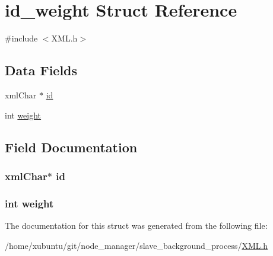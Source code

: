 \hypertarget{structid__weight}{}\section{id\+\_\+weight Struct Reference}
\label{structid__weight}


{\ttfamily \#include $<$X\+M\+L.\+h$>$}

\subsection*{Data Fields}
\begin{DoxyCompactItemize}
\item 
xml\+Char $\ast$ \hyperlink{structid__weight_a7350eff9ea77515688fd32b15775583c}{id}
\item 
int \hyperlink{structid__weight_aa01147b1f07072d246c76dc85d69df7c}{weight}
\end{DoxyCompactItemize}


\subsection{Field Documentation}
\hypertarget{structid__weight_a7350eff9ea77515688fd32b15775583c}{}
\subsubsection[{id}]{\setlength{\rightskip}{0pt plus 5cm}xml\+Char$\ast$ id}\label{structid__weight_a7350eff9ea77515688fd32b15775583c}
\hypertarget{structid__weight_aa01147b1f07072d246c76dc85d69df7c}{}
\subsubsection[{weight}]{\setlength{\rightskip}{0pt plus 5cm}int weight}\label{structid__weight_aa01147b1f07072d246c76dc85d69df7c}


The documentation for this struct was generated from the following file\+:\begin{DoxyCompactItemize}
\item 
/home/xubuntu/git/node\+\_\+manager/slave\+\_\+background\+\_\+process/\hyperlink{_x_m_l_8h}{X\+M\+L.\+h}\end{DoxyCompactItemize}
